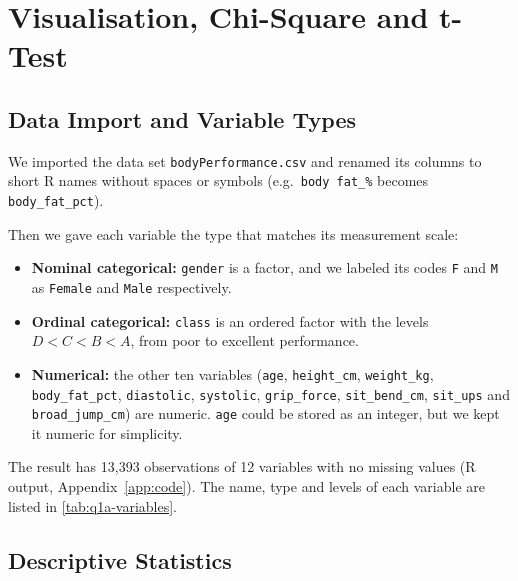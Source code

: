 \section{Visualisation, Chi-Square and t-Test}\label{sec:q1}

\subsection{Data Import and Variable Types}\label{sec:q1a}


We imported the data set \texttt{bodyPerformance.csv} and renamed its columns to short R names without spaces or symbols (e.g.\ \texttt{body fat\_\%} becomes \texttt{body\_fat\_pct}).

Then we gave each variable the type that matches its measurement scale:

\begin{itemize}
  \item \textbf{Nominal categorical:} \texttt{gender} is a factor, and we labeled its codes \texttt{F} and \texttt{M} as \texttt{Female} and \texttt{Male} respectively.
  \item \textbf{Ordinal categorical:} \texttt{class} is an ordered factor with the levels $D < C < B < A$, from poor to excellent performance.
  \item \textbf{Numerical:} the other ten variables (\texttt{age}, \texttt{height\_cm}, \texttt{weight\_kg}, \texttt{body\_fat\_pct}, \texttt{diastolic}, \texttt{systolic}, \texttt{grip\_force}, \texttt{sit\_bend\_cm}, \texttt{sit\_ups} and \texttt{broad\_jump\_cm}) are numeric.
    \texttt{age} could be stored as an integer, but we kept it numeric for simplicity.
\end{itemize}

The result has 13,393 observations of 12 variables with no missing values (R output, Appendix~\ref{app:code}).
The name, type and levels of each variable are listed in \autoref{tab:q1a-variables}.

\subsection{Descriptive Statistics}\label{sec:q1b}

